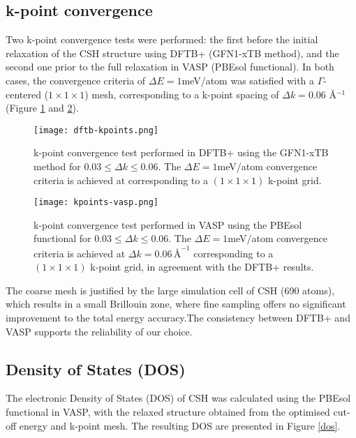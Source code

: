 \subsection{k-point convergence}
 Two k-point convergence tests were performed: the first before the initial relaxation of the CSH structure using DFTB+ (GFN1-xTB method), and the second one prior to the full relaxation in VASP (PBEsol functional). In both cases, the convergence criteria of $\Delta E = 1$meV/atom was satisfied with a $\Gamma$-centered ($1\times 1\times 1$) mesh, corresponding to a k-point spacing of $\Delta k=0.06$ Å$^{-1}$ (Figure \ref{dftb-kpoints} and \ref{kpoints-vasp}). 
\begin{figure}[H]
    \centering
    \texttt{[image: dftb-kpoints.png]}
    \caption{k-point convergence test performed in DFTB+ using the GFN1-xTB method for $0.03 \leq \Delta k \leq 0.06$. The 
    $\Delta E = 1$meV/atom convergence criteria is achieved at  corresponding to a $(1\times 1\times 1)$ k-point grid. 
    }
    \label{dftb-kpoints}
\end{figure}

\begin{figure}[H]
    \centering
    \texttt{[image: kpoints-vasp.png]}
    \caption{k-point convergence test performed in VASP using the PBEsol functional for $0.03 \leq \Delta k \leq 0.06$. The $\Delta E = 1$meV/atom convergence criteria is achieved at $\Delta k = 0.06 \,\text{\AA}^{-1}$ corresponding to a $(1\times 1\times 1)$ k-point grid, in agreement with the DFTB+ results.
    }
    \label{kpoints-vasp}
\end{figure}
The coarse mesh is justified by the large simulation cell of CSH (690 atoms), which results in a small Brillouin zone, where fine sampling offers no significant improvement to the total energy accuracy\supercite{Kresse1996}.The consistency between DFTB+ and VASP supports the reliability of our choice.  
\subsection{Density of States (DOS)}
The electronic Density of States (DOS) of CSH was calculated using the PBEsol functional in VASP, with the relaxed structure obtained from the optimised cut-off energy and k-point mesh. The resulting DOS are presented in Figure \ref{dos}.

